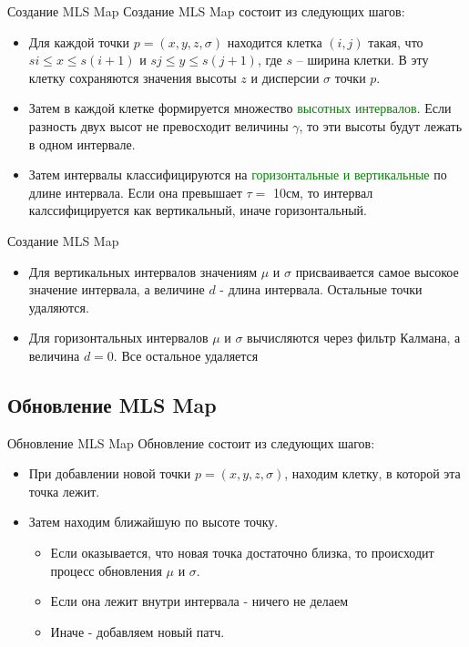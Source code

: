 \documentclass[9pt]{beamer}
\begin{document}
\begin{frame}{Создание MLS Map}
  Создание MLS Map состоит из следующих шагов:
  \begin{itemize}
    \item
    { 
      Для каждой точки $p = (x,y,z, \sigma)$ находится клетка $(i,j)$ такая, что $si \leq x \leq s(i+1)$ и $sj \leq y \leq s(j+1)$, где $s$ -- ширина клетки. В эту клетку сохраняются значения высоты $z$ и дисперсии $\sigma$ точки $p$.
    }
    \item
    {
      Затем в каждой клетке формируется множество \textcolor{green}{высотных интервалов}. 
      Если разность двух высот не превосходит величины $\gamma$, то эти высоты будут лежать в одном интервале.
    }
    \item
    {
      Затем интервалы классифицируются на \textcolor{green}{горизонтальные и вертикальные} по длине интервала. 
      Если она превышает $\tau =$ 10см, то интервал калссифицируется как вертикальный, иначе горизонтальный.
    }
    \end{itemize}
\end{frame}

\begin{frame}{Создание MLS Map}
  \begin{itemize}
    \item
    { 
      Для вертикальных интервалов значениям $\mu$ и $\sigma$ присваивается самое высокое значение интервала, а величине $d$ - длина интервала. Остальные точки удаляются.
    }
    \item
    {
      Для горизонтальных интервалов $\mu$ и $\sigma$ вычисляются через фильтр Калмана, а величина $d = 0$. Все остальное удаляется
    }
    \end{itemize}
\end{frame} 

\subsection{Обновление MLS Map}

\begin{frame}{Обновление MLS Map}
 Обновление состоит из следующих шагов:
  \begin{itemize}
    \item
    { 
      При добавлении новой точки $p=(x,y,z, \sigma)$, находим клетку, в которой эта точка лежит.
    }
    \item
    {
      Затем находим ближайшую по высоте точку. 
      \begin{itemize}
        \item
        { 
          Если оказывается, что новая точка достаточно близка, то происходит процесс обновления $\mu$ и $\sigma$.
        }
        \item
        {
          Если она лежит внутри интервала - ничего не делаем
        }
        \item
        {
          Иначе - добавляем новый патч.
        }
      \end{itemize}
    }
  \end{itemize}
\end{frame}
\end{document}
